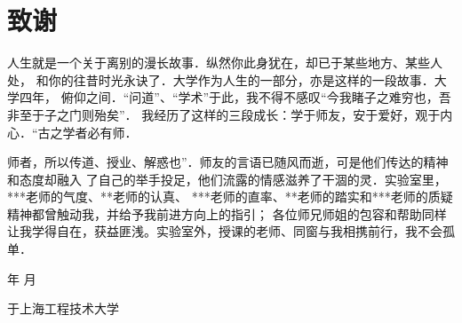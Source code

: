 
\chapter{致\qquad 谢}

{\songti\xiaosi
人生就是一个关于离别的漫长故事．纵然你此身犹在，却已于某些地方、某些人处，
和你的往昔时光永诀了．大学作为人生的一部分，亦是这样的一段故事．大学四年，
俯仰之间．“问道”、“学术”于此，我不得不感叹“今我睹子之难穷也，吾非至于子之门则殆矣”．
我经历了这样的三段成长：学于师友，安于爱好，观于内心．“古之学者必有师．

师者，所以传道、授业、解惑也”．师友的言语已随风而逝，可是他们传达的精神和态度却融入
了自己的举手投足，他们流露的情感滋养了干涸的灵．实验室里，***老师的气度、**老师的认真、
***老师的直率、**老师的踏实和***老师的质疑精神都曾触动我，并给予我前进方向上的指引；
各位师兄师姐的包容和帮助同样让我学得自在，获益匪浅。实验室外，授课的老师、同窗与我相携前行，我不会孤单．

\vspace{8cm}
\begin{flushright}
    年 \qquad 月

    于上海工程技术大学
\end{flushright}
}